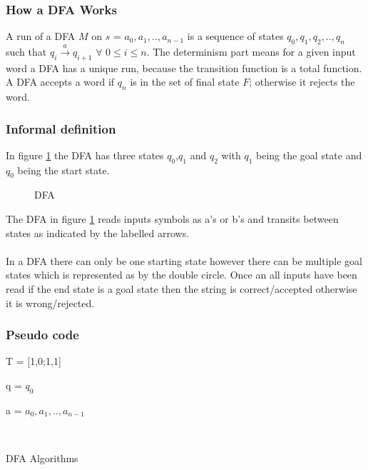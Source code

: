 \subsubsection{How a DFA Works}
A run of a DFA $M$ on $s$ = $a_0,a_1,..,a_{n-1}$ is a sequence of states $q_0,q_1,q_2,..,q_n$ such that $q_i \xrightarrow{a}q_{i+1}\,\, \forall \,\, 0\leq i \le n$. The determinism part means for a given input word a DFA has a unique run, because the transition function is a total function. A DFA accepts a word if $q_n$ is in the set of final state $F$; otherwise it rejects the word.
\subsubsection{Informal definition}
In figure \ref{fig:DFSA} the DFA has three states $q_0$,$q_1$ and $q_2$ with $q_1$ being the goal state and $q_0$ being the start state.
\begin{figure}[H]
    \centering
    \caption{DFA}
    \label{fig:DFSA}
\end{figure}
The DFA in figure \ref{fig:DFSA} reads inputs symbols as a's or b's and transits between states as indicated by the labelled arrows. 
\\\\
In a DFA there can only be one starting state however there can be multiple goal states which is represented as by the double circle. Once an all inputs have been read if the end state is a goal state then the string is correct/accepted otherwise it is wrong/rejected. 
\subsubsection{Pseudo code}
\begin{algorithm}[H]
\SetAlgoLined
{}
 T = [1,0;1,1]\;
 
 q = $q_0$\;
 
 a = $a_0,a_1,..,a_{n-1}$\;
 
 \\
 \caption{DFA Algorithms}
\end{algorithm}
